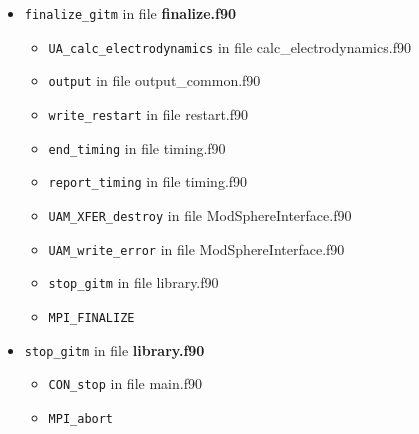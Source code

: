 \begin{itemize}
\item {\tt finalize\_gitm}   in file {\bf finalize.f90}
  \begin{itemize}
    \item {\tt UA\_calc\_electrodynamics} in file calc\_electrodynamics.f90
    \item {\tt output} in file output\_common.f90
    \item {\tt write\_restart} in file restart.f90
    \item {\tt end\_timing} in file timing.f90
    \item {\tt report\_timing} in file timing.f90
    \item {\tt UAM\_XFER\_destroy} in file ModSphereInterface.f90
    \item {\tt UAM\_write\_error} in file ModSphereInterface.f90
    \item {\tt stop\_gitm} in file library.f90
    \item {\tt MPI\_FINALIZE}
  \end{itemize}


\item {\tt stop\_gitm}   in file {\bf library.f90}
  \begin{itemize}
    \item {\tt CON\_stop} in file main.f90
    \item {\tt MPI\_abort}
  \end{itemize}
\end{itemize}
